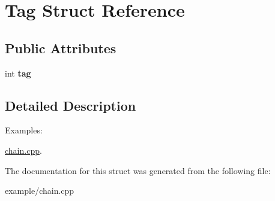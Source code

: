 \hypertarget{structTag}{}\section{Tag Struct Reference}
\label{structTag}
\subsection*{Public Attributes}
\begin{DoxyCompactItemize}
\item 
\hypertarget{structTag_ad43e43b198c0b65606c1f37aab45070f}{}int {\bfseries tag}\label{structTag_ad43e43b198c0b65606c1f37aab45070f}

\end{DoxyCompactItemize}


\subsection{Detailed Description}
\begin{Desc}
\item[Examples\+: ]\par
\hyperlink{chain_8cpp-example}{chain.\+cpp}.\end{Desc}


The documentation for this struct was generated from the following file\+:\begin{DoxyCompactItemize}
\item 
example/chain.\+cpp\end{DoxyCompactItemize}
